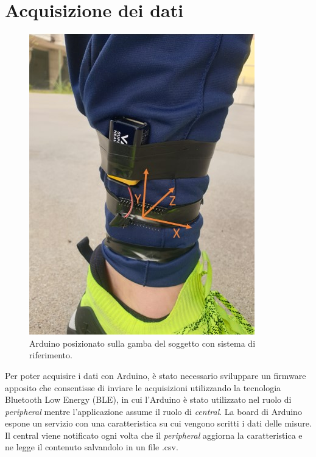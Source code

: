 \clearpage

\section{Acquisizione dei dati}
\begin{figure}[tbh]
	\centering
	\includegraphics[width=0.4\linewidth]{./ImageFiles/arduino_su_gamba_frame.jpg}
	\caption{Arduino posizionato sulla gamba del soggetto con sistema di riferimento.}
	\label{fig:arduino_su_gamba}
\end{figure}
Per poter acquisire i dati con Arduino, è stato necessario sviluppare un firmware apposito che consentisse di inviare le acquisizioni utilizzando la tecnologia Bluetooth Low Energy (BLE), in cui l'Arduino è stato utilizzato nel ruolo di \textit{peripheral} mentre l'applicazione assume il ruolo di \textit{central}. La board di Arduino espone un servizio con una caratteristica su cui vengono scritti i dati delle misure. Il central viene notificato ogni volta che il \textit{peripheral} aggiorna la caratteristica e ne legge il contenuto salvandolo in un file .csv.

